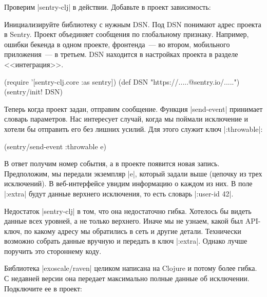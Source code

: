 Проверим \spverb|sentry-clj| в действии. Добавьте в проект зависимость:

\begin{english}
  \begin{clojure}
  \end{clojure}
\end{english}

Инициализируйте библиотеку с нужным DSN. Под DSN понимают адрес проекта в
Sentry. Проект объединяет сообщения по глобальному признаку. Например, ошибки
бекенда в одном проекте, фронтенда~--- во втором, мобильного приложения~--- в
третьем. DSN находится в настройках проекта в разделе <<интеграция>>.

\begin{english}
  \begin{clojure}
(require '[sentry-clj.core :as sentry])
(def DSN "https://.....@sentry.io/.....")
(sentry/init! DSN)
  \end{clojure}
\end{english}

Теперь когда проект задан, отправим сообщение. Функция \spverb|send-event|
принимает словарь параметров. Нас интересует случай, когда мы поймали исключение
и хотели бы отправить его без лишних усилий. Для этого служит ключ
\spverb|:throwable|:

\begin{english}
  \begin{clojure}
(sentry/send-event {:throwable e})
  \end{clojure}
\end{english}

В ответ получим номер события, а в проекте появится новая запись. Предположим,
мы передали экземпляр \spverb|e|, который задали выше (цепочку из трех
исключений). В веб-интерфейсе увидим информацию о каждом из них. В поле
\spverb|:extra| будут данные верхнего исключения, то есть словарь
\spverb|{:user-id 42}|.

Недостаток \spverb|sentry-clj| в том, что она недостаточно гибка. Хотелось бы
видеть данные всех уровней, а не только верхнего. Иначе мы не узнаем, какой был
API-ключ, по какому адресу мы обратились в сеть и другие детали. Технически
возможно собрать данные вручную и передать в ключ \spverb|:extra|. Однако лучше
поручить это стороннему коду.

Библиотека \spverb|exoscale/raven| целиком написана на Clojure и потому более
гибка. С недавней версии она передает максимально полные данные об
исключении. Подключите ее в проект:

